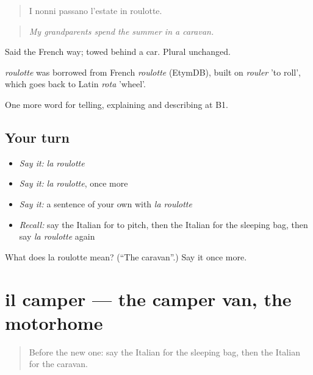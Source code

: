 \begin{quote}
I nonni passano l'estate in roulotte.
\end{quote}

\begin{quote}
\emph{My grandparents spend the summer in a caravan.}
\end{quote}

Said the French way; towed behind a car. Plural unchanged.

\begin{cousinweb}
\emph{roulotte} was borrowed from French \emph{roulotte} (EtymDB), built on \emph{rouler} 'to roll', which goes back to Latin \emph{rota} 'wheel'.
\end{cousinweb}

\begin{grammarlens}[title={What you've built}]
One more word for telling, explaining and describing at B1.
\end{grammarlens}

\subsection*{Your turn}
\begin{itemize}
\raggedright
  \item \emph{Say it:} \emph{la roulotte}
  \item \emph{Say it:} \emph{la roulotte}, once more
  \item \emph{Say it:} a sentence of your own with \emph{la roulotte}
  \item \emph{Recall:} say the Italian for to pitch, then the Italian for the sleeping bag, then say \emph{la roulotte} again
\end{itemize}

\begin{tcolorbox}[breakable,colback=teal!4,colframe=teal!35!black,title={Before you move on}]
What does la roulotte mean? (\textquotedblleft{}The caravan\textquotedblright{}.) Say it once more.
\end{tcolorbox}
\section[il camper]{il camper — the camper van, the motorhome}

\label{lesson:IT-C430-camper}



\begin{quote}
Before the new one: say the Italian for the sleeping bag, then the Italian for the caravan.
\end{quote}


